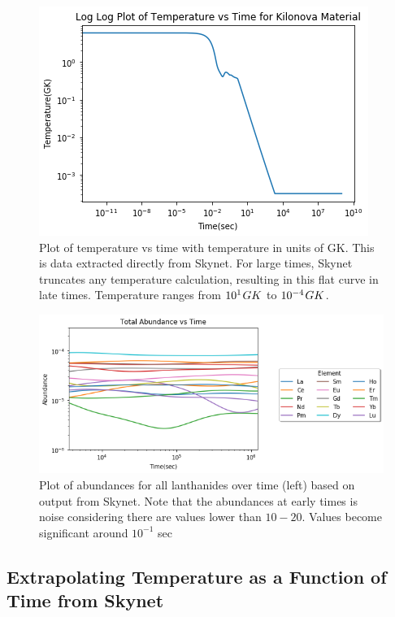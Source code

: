 \documentclass[11pt,a4paper]{article}
\begin{document}
\begin{figure}[h!]
  \includegraphics[]{skynet_non_linear.png}
  \caption{Plot of temperature vs time with temperature in units of GK. This is data extracted directly from Skynet. For large times, Skynet truncates any temperature calculation, resulting in this flat curve in late times. Temperature ranges from $10^1 \hspace{.03 cm} GK$ to $10^{-4} \hspace{.03 cm} GK$.}
\end{figure}

\begin{figure}[h!]
  \includegraphics[scale = .75]{elemental.png}
  \caption{Plot of abundances for all lanthanides over time (left) based on output from Skynet. Note that the abundances at early times is noise considering there are values lower than $10-20$. Values become significant around $10^{-1}$ sec}
\end{figure} 


\subsection{Extrapolating Temperature as a Function of Time from Skynet}
\end{document}
